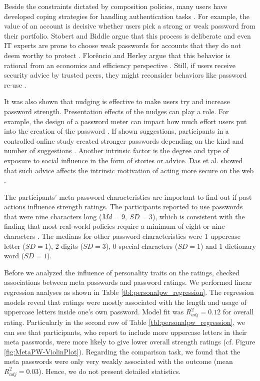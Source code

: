 Beside the constraints dictated by composition policies, many users have developed coping strategies for handling authentication tasks \cite{Stobert2014PasswordLifeCycle}. For example, the value of an account is decisive whether users pick a strong or weak password from their portfolio. Stobert and Biddle argue that this process is deliberate and even IT experts are prone to choose weak passwords for accounts that they do not deem worthy to protect  \cite{Stobert2015ExpertPassword}. Flor\^{e}ncio and Herley argue that this behavior is rational from an economics and efficiency perspective \cite{Florencio2014PasswordPortfoliosFiniteUser}. Still, if users receive security advice by trusted peers, they might reconsider behaviors like password re-use \cite{Das2014EffectSocialInfluenceSecuritySensitivity}.


It was also shown that nudging is effective to make users try and increase password strength. Presentation effects of the nudges can play a role. For example, the design of a password meter can impact how much effort users put into the creation of the password \cite{Ur2012HowDoesYourPasswordMeasureUp}. If shown suggestions, participants in a controlled online study created stronger passwords depending on the kind and number of suggestions \cite{Seitz2016SuggestionsDecoy}. Another intrinsic factor is the degree and type of exposure to social influence in the form of stories or advice. Das et al. showed that such advice affects the intrinsic motivation of acting more secure on the web \cite{Das2014EffectSocialInfluenceSecuritySensitivity}. 

The participants' meta password characteristics are important to find out if past actions influence strength ratings. The participants reported to use passwords that were nine characters long ($Md=9,~SD=3$), which is consistent with the finding that most real-world policies require a minimum of eight or nine characters \cite{Wang2015EmperorsPolicies}. The medians for other password characteristics were 1 uppercase letter ($SD=1$), 2 digits ($SD=3$), 0 special characters ($SD=1$) and 1 dictionary word ($SD=1$).

Before we analyzed the influence of personality traits on the ratings, checked associations between meta passwords and password ratings. We performed linear regression analyses as shown in Table \ref{tbl:personalpw_regression}. The regression models reveal that ratings were mostly associated with the length and usage of uppercase letters inside one's own password. Model fit was $R^2_{adj}=0.12$ for overall rating. Particularly in the second row of Table \ref{tbl:personalpw_regression}, we can see that participants, who report to include more uppercase letters in their meta passwords, were more likely to give lower overall strength ratings (cf. Figure \ref{fig:MetaPW-ViolinPlot}). Regarding the comparison task, we found that the meta passwords were only very weakly associated with the outcome (mean $R^2_{adj}=0.03$). Hence, we do not present detailed statistics. 


